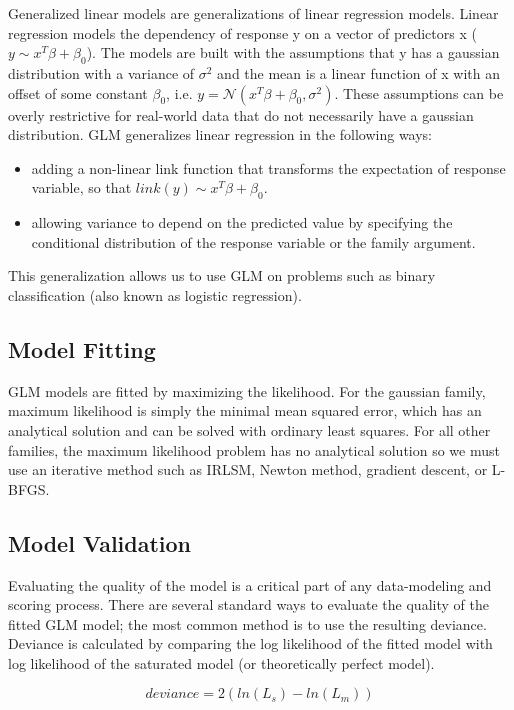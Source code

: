 \documentclass{article}[11pt]
\begin{document}
Generalized linear models are generalizations of linear regression models. Linear regression models the dependency of response y on a vector of predictors x ($y \sim x^T \beta + \beta_0$). The models are built with the assumptions that y has a gaussian distribution with a variance of $\sigma^2$ and the mean is a linear function of x with an offset of some constant $\beta_0$, i.e. $ y = \mathcal{N}(x^T \beta + \beta_0 ,  \sigma^2) $. These assumptions can be overly restrictive for real-world data that do not necessarily have a gaussian distribution. GLM generalizes linear regression in the following ways: 
\begin{itemize} 
\item adding a non-linear link function that transforms the expectation of response variable, so that $link(y) \sim x^T \beta + \beta_0$.
\item allowing variance to depend on the predicted value by specifying the conditional distribution of the response variable or the family argument.

\end{itemize}
This generalization allows us to use GLM on problems such as binary classification (also known as logistic regression).

\subsection{Model Fitting}
GLM models are fitted by maximizing the likelihood. For the gaussian family, maximum likelihood is simply the minimal mean squared error, which has an analytical solution and can be solved with ordinary least squares. For all other families, the maximum likelihood problem has no analytical solution so we must use an iterative method such as IRLSM, Newton method, gradient descent, or L-BFGS.

\subsection{Model Validation}
Evaluating the quality of the model is a critical part of any data-modeling and scoring process. There are several standard ways to evaluate the quality of the fitted GLM model; the most common method is to use the resulting deviance. Deviance is calculated by comparing the log likelihood of the fitted model with log likelihood of the saturated model (or theoretically perfect model).

\[ deviance = 2({ln(L_{s})} - {ln(L_{m})}) \]
\end{document}
